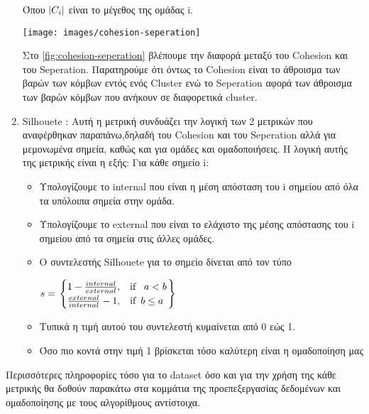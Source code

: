 \begin{enumerate}
Όπου  $\left\lvert C_i\right\rvert$ είναι το μέγεθος της ομάδας i.

\begin{minipage}{1.0\linewidth}
\centering
{}
\texttt{[image: images/cohesion-seperation]}
\label{fig:cohesion-seperation}
\end{minipage}
	
Στο 
\hyperref[fig:cohesion-seperation]{\figurename{} \ref{fig:cohesion-seperation}}
βλέπουμε την διαφορά μεταξύ του Cohesion και του Seperation. Παρατηρούμε ότι όντως το Cohesion είναι το άθροισμα των βαρών των κόμβων εντός ενός Cluster ενώ το Seperation αφορά των άθροισμα των βαρών κόμβων που ανήκουν σε διαφορετικά cluster.

	\item Silhouete : Αυτή η μετρική συνδυάζει την λογική των 2 μετρικών που αναφέρθηκαν παραπάνω,δηλαδή του Cohesion και του Seperation αλλά για μεμονωμένα σημεία, καθώς και για ομάδες και ομαδοποιήσεις. Η λογική αυτής της μετρικής είναι η εξής:
	Για κάθε σημείο i:
	
	\begin{itemize}
		\item Υπολογίζουμε το internal που είναι η μέση απόσταση του i σημείου από όλα τα υπόλοιπα σημεία στην ομάδα.
		\item Υπολογίζουμε το external που είναι το ελάχιστο της μέσης απόστασης του i σημείου από τα σημεία στις άλλες ομάδες.
		\item Ο συντελεστής Silhouete για το σημείο δίνεται από τον τύπο
		 
		$\begin{displaystyle}
		s = \left.
		\begin{cases}
		1-  \frac{internal}{external}  , & \text{if }   \enspace a < b \\
		\frac{external}{internal}-1 ,&\text{if} \enspace b \leq a 
		
		\end{cases}
		\right\} 
		\end{displaystyle}$
		\item Τυπικά η τιμή αυτού του συντελεστή κυμαίνεται από 0 εώς 1.
		\item Όσο πιο κοντά στην τιμή 1 βρίσκεται τόσο καλύτερη είναι η ομαδοποίηση μας
	\end{itemize}
 
\end{enumerate}

Περισσότερες πληροφορίες τόσο για το dataset όσο και για την χρήση της κάθε μετρικής θα δοθούν παρακάτω στα κομμάτια της προεπεξεργασίας δεδομένων και ομαδοποίησης με τους αλγορίθμους αντίστοιχα.


